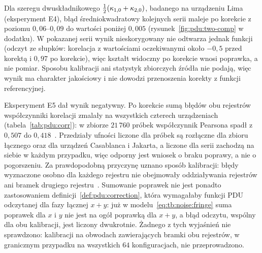 Dla szeregu dwuskładnikowego $\tfrac{1}{2}(\kappa_{1,0}+\kappa_{2,0})$, badanego na urządzeniu Lima (eksperyment E4), błąd średniokwadratowy kolejnych serii maleje po korekcie z poziomu $0{,}06$--$0{,}09$ do wartości poniżej $0{,}005$ (rysunek~\ref{fig:pdu:two-comp} w dodatku).
W pokazanej serii wynik nieskorygowany nie odtwarza jednak funkcji (odczyt ze słupków: korelacja z wartościami oczekiwanymi około $-0{,}5$ przed korektą i $0{,}97$ po korekcie), więc kształt widoczny po korekcie wnosi poprawka, a nie pomiar.
Sposobu kalibracji ani statystyk zbiorczych źródła nie podają, więc wynik ma charakter jakościowy i nie dowodzi przenoszenia korekty z funkcji referencyjnej.

Eksperyment E5 dał wynik negatywny.
Po korekcie sumą błędów obu rejestrów współczynniki korelacji zmalały na wszystkich czterech urządzeniach (tabela~\ref{tab:pdu:corr}): w zbiorze $21\,760$ próbek współczynnik Pearsona spadł z $0{,}507$ do $0{,}418$~\cite{werner_magisterka_2022}.
Przedziały ufności liczone dla próbek są rozłączne dla zbioru łącznego oraz dla urządzeń Casablanca i Jakarta, a liczone dla serii zachodzą na siebie w każdym przypadku, więc odporny jest wniosek o braku poprawy, a nie o pogorszeniu.
Za prawdopodobną przyczynę uznano sposób kalibracji: błędy wyznaczone osobno dla każdego rejestru nie obejmowały oddziaływania rejestrów ani bramek drugiego rejestru~\cite{werner_magisterka_2022}.
Sumowanie poprawek nie jest ponadto zastosowaniem definicji~\ref{def:pdu:correction}, która wymagałaby funkcji PDU odczytanej dla fazy łącznej $x+y$: już w modelu~\eqref{eq:tb:noise:fringe} suma poprawek dla $x$ i $y$ nie jest na ogół poprawką dla $x+y$, a błąd odczytu, wspólny dla obu kalibracji, jest liczony dwukrotnie.
Żadnego z tych wyjaśnień nie sprawdzono: kalibracji na obwodach zawierających bramki obu rejestrów, w granicznym przypadku na wszystkich $64$ konfiguracjach, nie przeprowadzono.

